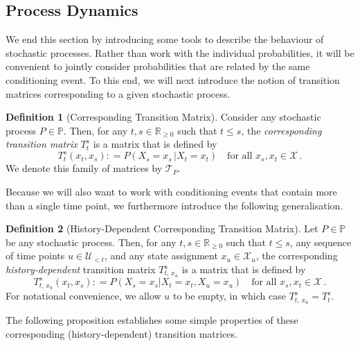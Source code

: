 \documentclass[10pt,a4paper]{paper}
\theoremstyle{definition}
\newtheorem{definition}{Definition}
\newcommand{\reals}{\mathbb{R}}
\newcommand{\realsnonneg}{\reals_{\geq 0}}
\newcommand{\states}{\mathcal{X}}
\newcommand{\processes}{\mathbb{P}}
\newcommand{\coloneqq}{:\!=}
\begin{document}
\subsection{Process Dynamics}\label{sec:dynamics}

We end this section by introducing some tools to describe the behaviour of stochastic processes. Rather than work with the individual probabilities, it will be convenient to jointly consider probabilities that are related by the same conditioning event. To this end, we will next introduce the notion of transition matrices corresponding to a given stochastic process.

\begin{definition}[Corresponding Transition Matrix]\label{def:trans_matrix}
Consider any stochastic process $P\in\processes$. Then, for any $t,s\in\realsnonneg$ such that $t\leq s$, the \emph{corresponding transition matrix} $T_t^s$ is a matrix that is defined by
\begin{equation*}
T_t^s(x_t, x_s) \coloneqq P(X_s=x_s\,\vert X_t=x_t)\quad\text{for all $x_s,x_t\in\states$}\,.
\end{equation*}
We denote this family of matrices by $\mathcal{T}_P$.
\end{definition}

Because we will also want to work with conditioning events that contain more than a single time point, we furthermore introduce the following generalisation.

\begin{definition}[History-Dependent Corresponding Transition Matrix]
Let $P\in\processes$ be any stochastic process. Then, for any $t,s\in\realsnonneg$ such that $t\leq s$, any sequence of time points $u\in\mathcal{U}_{<t}$, and any state assignment $x_u\in\states_u$, the corresponding \emph{history-dependent} transition matrix $T_{t,\,x_u}^s$ is a matrix that is defined by
\begin{equation*}
T^s_{t,\,x_u}(x_t,x_s)
\coloneqq
P(X_s=x_s\vert X_t=x_t, X_u=x_u)\quad\text{for all $x_s,x_t\in\states$}\,.
\end{equation*}
For notational convenience, we allow $u$ to be empty, in which case $T_{t,\,x_u}^s=T_t^s$.
\end{definition}

The following proposition establishes some simple properties of these corresponding (history-dependent) transition matrices.
\end{document}
